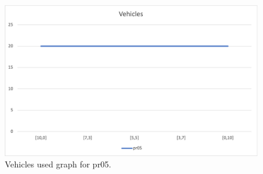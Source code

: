 \begin{figure}[H]
    \centering
    \includegraphics[height=0.25\textheight]{../graphs/pr05-vehicles.png}
    \caption{Vehicles used graph for pr05.}
\end{figure}

\newpage